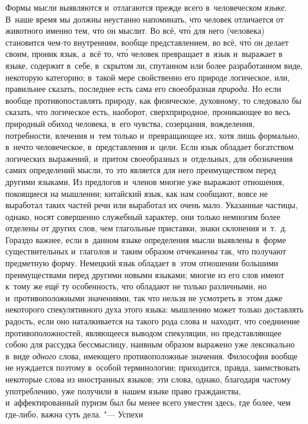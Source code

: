 Формы мысли выявляются и~отлагаются прежде всего в~человеческом {\em языке}.
В~наше время мы должны неустанно напоминать, что человек отличается от
животного именно тем, что он мыслит. Во всё, чт\'{о} для него (человека)
становится чем-то внутренним, вообще представлением, во всё, чт\'{о} он делает
своим, проник язык, а~всё то, чт\'{о} человек превращает в~язык и~выражает в
языке, содержит в~себе, в~скрытом ли, спутанном или более разработанном виде,
некоторую категорию; в~такой мере свойственно его природе логическое, или,
правильнее сказать, последнее есть сама его своеобразная {\em природа}. Но если
вообще противопоставлять природу, как физическое, духовному, то следовало бы
сказать, что логическое есть, наоборот, сверхприродное, проникающее во весь
природный обиход человека, в~его чувства, созерцания, вожделения, потребности,
влечения и~тем только и~превращающее их, хотя лишь формально, в~нечто
человеческое, в~представления и~цели. Если язык обладает богатством логических
выражений, и~притом своеобразных и~отдельных, для обозначения самих определений
мысли, то это является для него преимуществом перед другими языками. Из
предлогов и~членов многие уже выражают отношения, покоящиеся на мышлении;
китайский язык, как нам сообщают, вовсе не выработал таких частей речи или
выработал их очень мало. Указанные частицы, однако, носят совершенно служебный
характер, они только немногим более отделены от других слов, чем глагольные
приставки, знаки склонения и~т.~д. Гораздо важнее, если в~данном языке
определения мысли выявлены в~форме существительных и~глаголов и~таким образом
отчеканены так, что получают предметную форму. Немецкий язык обладает в~этом
отношении большими преимуществами перед другими новыми языками; многие из его
слов имеют к~тому же ещё ту особенность, что обладают не только различными, но
и~противоположными значениями, так что нельзя не усмотреть в~этом даже
некоторого спекулятивного духа этого языка: мышлению может только доставлять
радость, если оно наталкивается на такого рода слова и~находит, что соединение
противоположностей, являющееся выводом спекуляции, но представляющее собою для
рассудка бессмыслицу, наивным образом выражено уже лексикально в~виде {\em
одного} слова, имеющего противоположные значения. Философия вообще не нуждается
поэтому в~особой терминологии; приходится, правда, заимствовать некоторые слова
из иностранных языков; эти слова, однако, благодаря частому употреблению, уже
получили в~нашем языке право гражданства, и~аффектированный пуризм был бы менее
всего уместен здесь, где более, чем где-либо, важна суть дела. "--- Успехи
